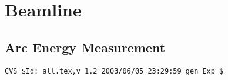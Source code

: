 \chapter{Beamline}
\graphicspath{{beamline/figs/}}
\renewcommand{\dirfig}[0]{beamline/figs}
\renewcommand{\dircur}[0]{beamline}


\newpage

\newpage

\newpage
\section{Arc Energy Measurement}

\newpage

\newpage

\newpage

\newpage

\newpage


%
%
{\small
\begin{verbatim}CVS $Id: all.tex,v 1.2 2003/06/05 23:29:59 gen Exp $\end{verbatim}
}
